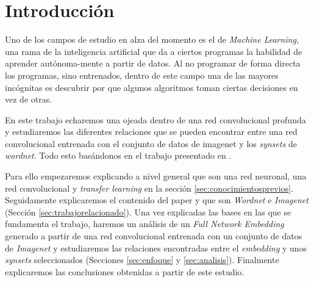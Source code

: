 \documentclass[12,twoside]{TFG-GM}
\theoremstyle{definition}
\theoremstyle{remark}
\begin{document}




\maketitle

\tableofcontents
\newpage

\section{Introducción}

Uno de los campos de estudio en alza del momento es el de \textit{Machine Learning}, una rama de la inteligencia artificial que da a ciertos programas la habilidad de aprender autónoma-mente a partir de datos. Al no programar de forma directa los programas, sino entrenados, dentro de este campo una de las mayores incógnitas es descubrir por que algunos algoritmos toman ciertas decisiones en vez de otras. 

En este trabajo echaremos una ojeada dentro de una red convolucional profunda y estudiaremos las diferentes relaciones que se pueden encontrar entre una red convolucional entrenada con el conjunto de datos de imagenet y los \textit{synsets} de \textit{wordnet}.
Todo esto basándonos en el trabajo presentado en \cite{fne}.  

Para ello empezaremos explicando a nivel general que son una red neuronal, una red convolucional y \textit{transfer learning} en la sección \ref{sec:conocimientosprevios}. Seguidamente explicaremos el contenido del paper \cite{fne} y que son \textit{Wordnet} e \textit{Imagenet} (Sección \ref{sec:trabajorelacionado}).
Una vez explicadas las bases en las que se fundamenta el trabajo, haremos un análisis de un \textit{Full Network Embedding} generado a partir de una red convolucional entrenada con un conjunto de datos de \textit{Imagenet} y estudiaremos las relaciones encontradas entre el \textit{embedding} y unos \textit{synsets} seleccionados (Secciones \ref{sec:enfoque} y \ref{sec:analisis}). Finalmente explicaremos las conclusiones obtenidas a partir de este estudio.    
\end{document}
